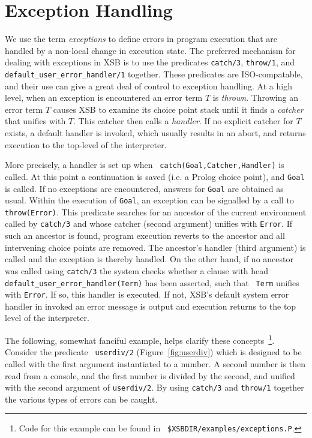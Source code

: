 \chapter{Exception Handling}\label{exception}

We use the term {\em exceptions} to define errors in program execution
that are handled by a non-local change in execution state.  The
preferred mechanism for dealing with exceptions in XSB is to use the
predicates {\tt catch/3}, {\tt throw/1}, and {\tt
default\_user\_error\_handler/1} together.  These predicates are
ISO-compatable, and their use can give a great deal of control to
exception handling.  At a high level, when an exception is encountered
an error term $T$ is {\em thrown}.  Throwing an error term $T$ causes
XSB to examine its choice point stack until it finds a {\em catcher}
that unifies with $T$.  This catcher then calls a {\em handler}.  If
no explicit catcher for $T$ exists, a default handler is invoked,
which usually results in an abort, and returns execution to the
top-level of the interpreter.

More precisely, a handler is set up when {\tt
catch(Goal,Catcher,Handler)} is called.  At this point a continuation
is saved (i.e. a Prolog choice point), and {\tt Goal} is called.  If
no exceptions are encountered, answers for {\tt Goal} are obtained as
usual.  Within the execution of {\tt Goal}, an exception can be
signalled by a call to {\tt throw(Error)}.  This predicate searches
for an ancestor of the current environment called by {\tt catch/3} and
whose catcher (second argument) unifies with {\tt Error}.  If such an
ancestor is found, program execution reverts to the ancestor and all
intervening choice points are removed.  The ancestor's handler (third
argument) is called and the exception is thereby handled.  On the
other hand, if no ancestor was called using {\tt catch/3} the system
checks whether a clause with head {\tt
default\_user\_error\_handler(Term)} has been asserted, such that {\tt
Term} unifies with {\tt Error}.  If so, this handler is executed.  If
not, XSB's default system error handler in invoked an error message is
output and execution returns to the top level of the interpreter.

The following, somewhat fanciful example, helps clarify these
concepts~\footnote{Code for this example can be found in {\tt
\$XSBDIR/examples/exceptions.P}.}.  Consider the predicate {\tt
userdiv/2} (Figure~\ref{fig:userdiv}) which is designed to be called
with the first argument instantiated to a number.  A second number is
then read from a console, and the first number is divided by the
second, and unified with the second argument of {\tt userdiv/2}.  By
using {\tt catch/3} and {\tt throw/1} together the various types of
errors can be caught.

